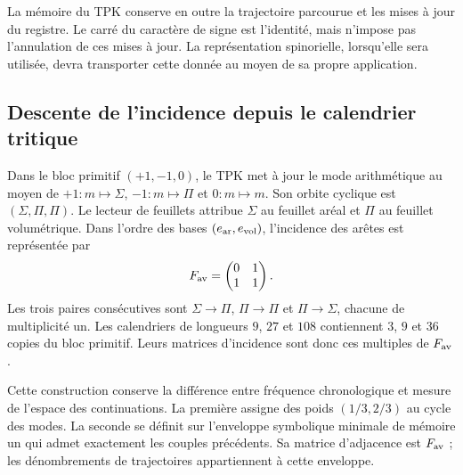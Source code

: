 La mémoire du TPK conserve en outre la trajectoire parcourue et les mises à jour du registre. Le carré du caractère de signe est l'identité, mais n'impose pas l'annulation de ces mises à jour. La représentation spinorielle, lorsqu'elle sera utilisée, devra transporter cette donnée au moyen de sa propre application.

\subsection{Descente de l’incidence depuis le calendrier tritique}

Dans le bloc primitif $(+1,-1,0)$, le TPK met à jour le mode arithmétique au moyen de
$+1:m\mapsto\Sigma$, $-1:m\mapsto\Pi$ et $0:m\mapsto m$. Son orbite cyclique
est $(\Sigma,\Pi,\Pi)$. Le lecteur de feuillets attribue $\Sigma$ au feuillet aréal et
$\Pi$ au feuillet volumétrique. Dans l’ordre des bases $(e_{\rm ar},e_{\rm vol})$,
l’incidence des arêtes est représentée par
\begin{equation}
 F_{\rm av}=\begin{pmatrix}0&1\\1&1\end{pmatrix}.
 \label{iii:iii:eq:fav}
\end{equation}
Les trois paires consécutives sont $\Sigma\to\Pi$, $\Pi\to\Pi$ et $\Pi\to\Sigma$, chacune de multiplicité un. Les calendriers de longueurs $9$, $27$ et $108$ contiennent $3$, $9$ et $36$ copies du bloc primitif. Leurs matrices d'incidence sont donc ces multiples de $F_{\rm av}$.

Cette construction conserve la différence entre fréquence chronologique et mesure
de l’espace des continuations. La première assigne des poids $(1/3,2/3)$ au cycle
des modes. La seconde se définit sur l’enveloppe symbolique minimale de mémoire
un qui admet exactement les couples précédents. Sa matrice d’adjacence est
$F_{\rm av}$ ; les dénombrements de trajectoires appartiennent à cette enveloppe.

